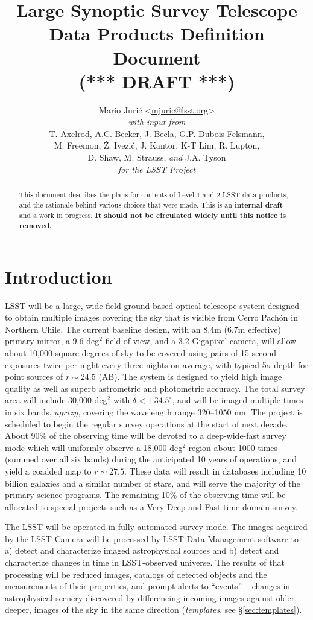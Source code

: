 \documentclass[12pt]{article}
\title{Large Synoptic Survey Telescope \\
Data Products Definition Document \\
(*** DRAFT ***)}
\author{
    Mario Juri\'c \textless\href{mailto:mjuric@lsst.org}{mjuric@lsst.org}\textgreater \vspace{1ex} \\
    {\em with input from} \vspace{1ex} \\
    T. Axelrod, A.C. Becker, J. Becla,  G.P. Dubois-Felsmann, \\
    M. Freemon, \v{Z}. Ivezi\'c, J. Kantor, K-T Lim, R. Lupton, \\
    D. Shaw, M. Strauss, {\em and} J.A. Tyson \vspace{1.2ex} \\
    {\em for the LSST Project}
}
\newcommand{\B}[1]{{#1}}
\newcommand{\R}[1]{{\color{red}}}
\begin{document}
\maketitle

\begin{abstract}
This document describes the plans for contents of Level 1 and 2 LSST data
products, and the rationale behind various choices that were made. This is an
{\bf internal draft} and a work in progress. {\bf It should not be circulated
widely until this notice is removed.}
\end{abstract}

\tableofcontents

\section{Introduction}

LSST will be a large, wide-field ground-based optical telescope system
designed to obtain multiple images covering the sky that is visible from Cerro
Pach\'{o}n in Northern Chile. The current baseline design, with an 8.4m (6.7m
effective) primary mirror, a 9.6 deg$^2$ field of view, and a 3.2 Gigapixel
camera, will allow about 10,000 square degrees of sky to be covered using
pairs of 15-second exposures \R{in two photometric bands} \B{twice per night}
every three nights on average, with typical 5$\sigma$ depth for point sources
of $r\sim24.5$ (AB). The system is designed to yield high image quality as
well as superb astrometric and photometric accuracy. The \B{total} survey area
will include 30,000 deg$^2$ with $\delta<+34.5^\circ$, and will be imaged
multiple times in six bands, $ugrizy$, covering the wavelength range 320--1050
nm. The project is scheduled to begin the regular survey operations at the
start of next decade. About 90\% of the observing time will be devoted to a
deep-wide-fast survey mode which will \B{uniformly} observe a 18,000 deg$^2$
region about 1000 times (summed over all six bands) during the anticipated 10
years of operations, and yield a coadded map to $r\sim27.5$. These data will
result in databases including 10 billion galaxies and a similar number of
stars, and will serve the majority of the primary science programs. The
remaining 10\% of the observing time will be allocated to special projects
such as a Very Deep and Fast time domain survey.

The LSST will be operated in fully automated survey mode. The images acquired
by the LSST Camera will be processed by LSST Data Management software to a)
detect and characterize imaged astrophysical sources and b) detect and
characterize changes in time in LSST-observed universe. The results of that
processing will be reduced images, catalogs of detected objects and the
measurements of their properties, and prompt alerts to ``events'' -- changes
in astrophysical scenery discovered by differencing incoming images against
older, deeper, images of the sky in the same direction ({\em templates}, see
\S \ref{sec:templates}).
\end{document}
